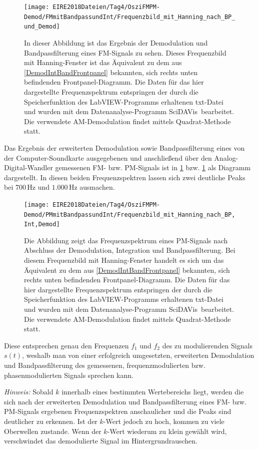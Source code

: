 \documentclass[
a4paper,
12pt,
pagesize,
ngerman
]{scrartcl}
\begin{document}
	\begin{figure}[H] %
		\centering
		\texttt{[image: EIRE2018Dateien/Tag4/OsziFMPM-Demod/FMmitBandpassundInt/Frequenzbild\_mit\_Hanning\_nach\_BP\_und\_Demod]}
		\caption{In dieser Abbildung ist das Ergebnis der Demodulation und Bandpassfilterung eines FM-Signals zu sehen. Dieses Frequenzbild mit Hanning-Fenster ist das Äquivalent zu dem aus \cref{DemodIntBandFrontpanel} bekannten, sich rechts unten befindenden Frontpanel-Diagramm. Die Daten für das hier dargestellte Frequenzspektrum entspringen der durch die Speicherfunktion des LabVIEW-Programms erhaltenen txt-Datei und wurden mit dem Datenanalyse-Programm \glqq SciDAVis\grqq\ bearbeitet. Die verwendete AM-Demodulation findet mittels \glqq Quadrat\grqq -Methode statt.}
		\label{FMIntBandDiagramm}
	\end{figure}
	
	\noindent Das Ergebnis der erweiterten Demodulation sowie Bandpassfilterung eines von der Computer-Soundkarte ausgegebenen und anschließend über den Analog-Digital-Wandler gemessenen FM- bzw. PM-Signals ist in \cref{FMIntBandDiagramm} bzw. \cref{FMIntBandDiagramm} als Diagramm dargestellt.
	In diesen beiden Frequenzspektren lassen sich zwei deutliche Peaks bei $700\,$Hz und $1.000\,$Hz ausmachen.
	
	\begin{figure}[H] %
		\centering
		\texttt{[image: EIRE2018Dateien/Tag4/OsziFMPM-Demod/PMmitBandpassundInt/Frequenzbild\_mit\_Hanning\_nach\_BP,Int,Demod]}
		\caption{Die Abbildung zeigt das Frequenzspektrum eines PM-Signals nach Abschluss der Demodulation, Integration und Bandpassfilterung. Bei diesem Frequenzbild mit Hanning-Fenster handelt es sich um das Äquivalent zu dem aus \cref{DemodIntBandFrontpanel} bekannten, sich rechts unten befindenden Frontpanel-Diagramm. Die Daten für das hier dargestellte Frequenzspektrum entspringen der durch die Speicherfunktion des LabVIEW-Programms erhaltenen txt-Datei und wurden mit dem Datenanalyse-Programm \glqq SciDAVis\grqq\ bearbeitet. Die verwendete AM-Demodulation findet mittels \glqq Quadrat\grqq -Methode statt.}
		\label{PMIntBandDiagramm}
	\end{figure}
	
	\noindent Diese entsprechen genau den Frequenzen $f_1$ und $f_2$ des zu modulierenden Signals $s(t)$, weshalb man von einer erfolgreich umgesetzten, erweiterten Demodulation und Bandpassfilterung des gemessenen, frequenzmodulierten bzw. phasenmodulierten Signals sprechen kann.
		
	\emph{Hinweis:} Sobald $k$ innerhalb eines bestimmten Wertebereichs liegt, werden die sich nach der erweiterten Demodulation und Bandpassfilterung eines FM- bzw. PM-Signals ergebenen Frequenzspektren anschaulicher und die Peaks sind deutlicher zu erkennen.
	Ist der $k$-Wert jedoch zu hoch, kommen zu viele Oberwellen zustande.
	Wenn der $k$-Wert wiederum zu klein gewählt wird, verschwindet das demodulierte Signal im Hintergrundrauschen.
	
	
	
	\printbibliography
	
	
\end{document}
